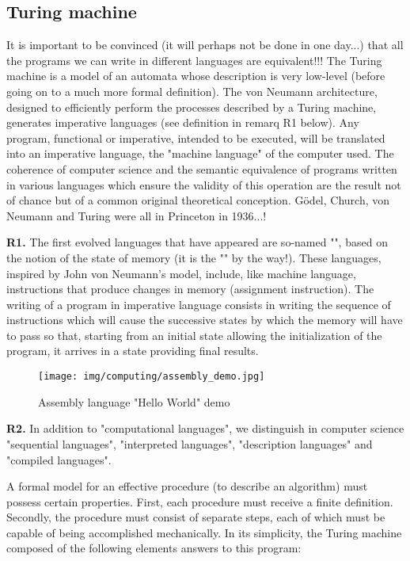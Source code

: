 	\subsection{Turing machine}
	It is important to be convinced (it will perhaps not be done in one day...) that all the programs we can write in different languages are equivalent!!! The Turing machine is a model of an automata whose description is very low-level (before going on to a much more formal definition). The von Neumann architecture, designed to efficiently perform the processes described by a Turing machine, generates imperative languages (see definition in remarq R1 below). Any program, functional or imperative, intended to be executed, will be translated into an imperative language, the "machine language" of the computer used. The coherence of computer science and the semantic equivalence of programs written in various languages which ensure the validity of this operation are the result not of chance but of a common original theoretical conception. Gödel, Church, von Neumann and Turing were all in Princeton in 1936...!
	\begin{tcolorbox}[title=Remarks,colframe=black,arc=10pt]
	\textbf{R1.} The first evolved languages that have appeared are so-named "", based on the notion of the state of memory (it is the "" by the way!). These languages, inspired by John von Neumann's model, include, like machine language, instructions that produce changes in memory (assignment instruction). The writing of a program in imperative language consists in writing the sequence of instructions which will cause the successive states by which the memory will have to pass so that, starting from an initial state allowing the initialization of the program, it arrives in a state providing final results.\\
	\begin{figure}[H]
		\centering
		\texttt{[image: img/computing/assembly\_demo.jpg]}
		\caption{Assembly language "Hello World" demo}
	\end{figure}
	\textbf{R2.} In addition to "computational languages", we distinguish in computer science "sequential languages", "interpreted languages", "description languages" and "compiled languages".
	\end{tcolorbox}
	A formal model for an effective procedure (to describe an algorithm) must possess certain properties. First, each procedure must receive a finite definition. Secondly, the procedure must consist of separate steps, each of which must be capable of being accomplished mechanically. In its simplicity, the Turing machine composed of the following elements answers to this program:
